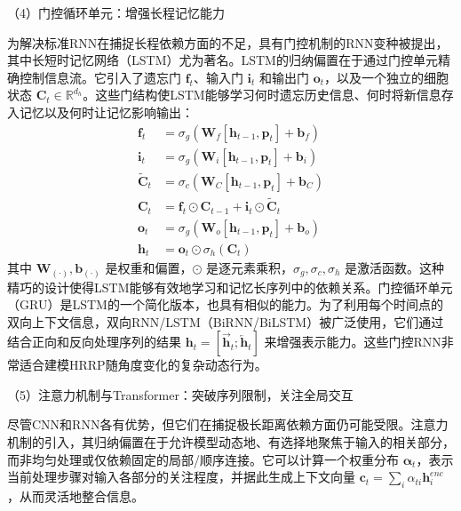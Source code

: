 （4）门控循环单元：增强长程记忆能力

为解决标准RNN在捕捉长程依赖方面的不足，具有门控机制的RNN变种被提出，其中长短时记忆网络（LSTM）尤为著名。LSTM的归纳偏置在于通过门控单元精确控制信息流。它引入了遗忘门 $\mathbf{f}_t$、输入门 $\mathbf{i}_t$ 和输出门 $\mathbf{o}_t$，以及一个独立的细胞状态 $\mathbf{C}_t \in \mathbb{R}^{d_h}$。这些门结构使LSTM能够学习何时遗忘历史信息、何时将新信息存入记忆以及何时让记忆影响输出：
\begin{align}
    \mathbf{f}_t &= \sigma_g(\mathbf{W}_f [\mathbf{h}_{t-1}, \mathbf{p}_t] + \mathbf{b}_f) \label{eq:lstm_f_dim_revised} \\
    \mathbf{i}_t &= \sigma_g(\mathbf{W}_i [\mathbf{h}_{t-1}, \mathbf{p}_t] + \mathbf{b}_i) \label{eq:lstm_i_dim_revised} \\
    \tilde{\mathbf{C}}_t &= \sigma_c(\mathbf{W}_C [\mathbf{h}_{t-1}, \mathbf{p}_t] + \mathbf{b}_C) \label{eq:lstm_c_tilde_dim_revised} \\
    \mathbf{C}_t &= \mathbf{f}_t \odot \mathbf{C}_{t-1} + \mathbf{i}_t \odot \tilde{\mathbf{C}}_t \label{eq:lstm_c_dim_revised} \\
    \mathbf{o}_t &= \sigma_g(\mathbf{W}_o [\mathbf{h}_{t-1}, \mathbf{p}_t] + \mathbf{b}_o) \label{eq:lstm_o_dim_revised} \\
    \mathbf{h}_t &= \mathbf{o}_t \odot \sigma_h(\mathbf{C}_t) \label{eq:lstm_h_dim_revised}
\end{align}
其中 $\mathbf{W}_{(\cdot)}, \mathbf{b}_{(\cdot)}$ 是权重和偏置，$\odot$ 是逐元素乘积，$\sigma_g, \sigma_c, \sigma_h$ 是激活函数。这种精巧的设计使得LSTM能够有效地学习和记忆长序列中的依赖关系。门控循环单元（GRU）是LSTM的一个简化版本，也具有相似的能力。为了利用每个时间点的双向上下文信息，双向RNN/LSTM（BiRNN/BiLSTM）被广泛使用，它们通过结合正向和反向处理序列的结果 $\mathbf{h}_t = [\overrightarrow{\mathbf{h}}_t; \overleftarrow{\mathbf{h}}_t]$ 来增强表示能力。这些门控RNN非常适合建模HRRP随角度变化的复杂动态行为。

（5）注意力机制与Transformer：突破序列限制，关注全局交互

尽管CNN和RNN各有优势，但它们在捕捉极长距离依赖方面仍可能受限。注意力机制的引入，其归纳偏置在于允许模型动态地、有选择地聚焦于输入的相关部分，而非均匀处理或仅依赖固定的局部/顺序连接。它可以计算一个权重分布 $\boldsymbol{\alpha}_t$，表示当前处理步骤对输入各部分的关注程度，并据此生成上下文向量 $\mathbf{c}_t = \sum_i \alpha_{ti} \mathbf{h}_i^{enc}$，从而灵活地整合信息。

